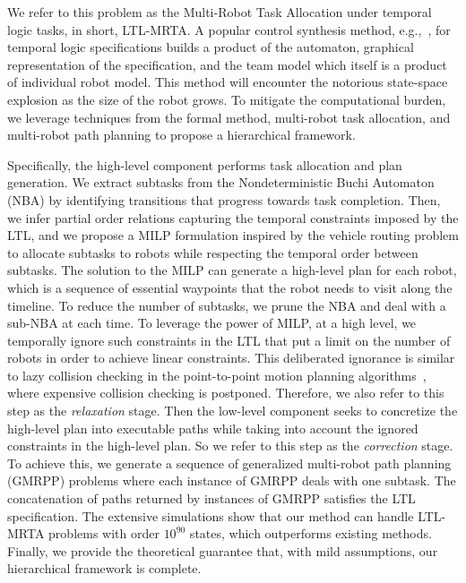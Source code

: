 \documentclass[Afour,sageh,times]{sagej}
\begin{document}
We refer to this problem as the Multi-Robot Task Allocation under temporal logic tasks, in short, LTL-MRTA. A popular control synthesis method, e.g.,~\cite{guo2015multi}, for temporal logic specifications builds a product of the automaton, graphical representation of the specification, and the team model which itself is a product of individual robot model. This method will encounter the notorious state-space explosion as the size of the robot grows. To mitigate the computational burden, we leverage techniques from the formal method, multi-robot task allocation, and multi-robot path planning to propose a hierarchical framework.

Specifically, the high-level component performs task allocation and plan generation. We extract subtasks from the Nondeterministic B$\ddot{\text{u}}$chi Automaton (NBA) by identifying transitions that progress towards task completion. Then, we infer partial order relations capturing the temporal constraints imposed by the LTL, and  we propose a MILP formulation inspired by the vehicle routing problem to allocate subtasks to robots while respecting the temporal order between subtasks. The solution to the MILP can generate a high-level plan for each robot, which is a sequence of essential waypoints that the robot needs to visit along the timeline. To reduce the number of subtasks, we prune the NBA and deal with a sub-NBA at each time.  To leverage the power of MILP, at a high level, we temporally ignore such constraints in the LTL that put a limit on the number of robots in order to achieve linear constraints. This deliberated ignorance is similar to lazy collision checking in the point-to-point motion planning algorithms~\citep{sanchez2003single,hauser2015lazy}, where expensive  collision checking is postponed. Therefore, we also refer to this step as the {\it relaxation} stage. Then the low-level component seeks to concretize the high-level plan into executable paths while taking into account the ignored constraints in the high-level plan. So we refer to this step as the {\it correction} stage. To achieve this, we generate a sequence of generalized multi-robot path planning (GMRPP) problems where each instance of GMRPP deals with one subtask. The concatenation of paths returned by instances of GMRPP satisfies the LTL specification. The extensive simulations show that our method can handle LTL-MRTA problems with order $10^{90}$ states, which outperforms existing methods. Finally, we provide the theoretical guarantee that, with mild assumptions, our hierarchical framework is complete.
\end{document}
